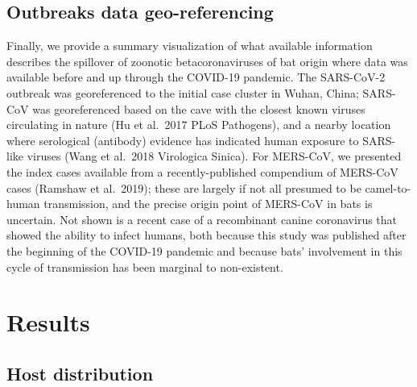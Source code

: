 \documentclass[11pt]{article}
\begin{document}
\hypertarget{outbreaks-data-geo-referencing}{%
\subsection{Outbreaks data
geo-referencing}\label{outbreaks-data-geo-referencing}}

Finally, we provide a summary visualization of what available
information describes the spillover of zoonotic betacoronaviruses of bat
origin where data was available before and up through the COVID-19
pandemic. The SARS-CoV-2 outbreak was georeferenced to the initial case
cluster in Wuhan, China; SARS-CoV was georeferenced based on the cave
with the closest known viruses circulating in nature (Hu et al.~2017
PLoS Pathogens), and a nearby location where serological (antibody)
evidence has indicated human exposure to SARS-like viruses (Wang et
al.~2018 Virologica Sinica). For MERS-CoV, we presented the index cases
available from a recently-published compendium of MERS-CoV cases
(Ramshaw et al.~2019); these are largely if not all presumed to be
camel-to-human transmission, and the precise origin point of MERS-CoV in
bats is uncertain. Not shown is a recent case of a recombinant canine
coronavirus that showed the ability to infect humans, both because this
study was published after the beginning of the COVID-19 pandemic and
because bats' involvement in this cycle of transmission has been
marginal to non-existent.

\hypertarget{results}{%
\section{Results}\label{results}}

\hypertarget{host-distribution}{%
\subsection{Host distribution}\label{host-distribution}}
\end{document}
